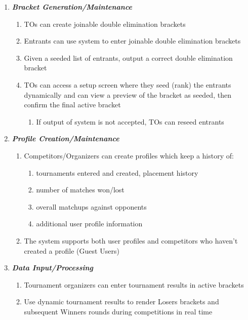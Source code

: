 \documentclass{article}
\begin{document}
\begin{enumerate}

    \item \textbf{\textit{Bracket Generation/Maintenance}}
        \begin{enumerate}[label*=\arabic*.]
            \item{{TOs can create joinable double elimination brackets}}\label{1.1}
            \item{{Entrants can use system to enter joinable double elimination brackets}}\label{1.2}
            \item{{Given a seeded list of entrants, output a correct double elimination bracket}}\label{1.3}
            \item{{TOs can access a setup screen where they seed (rank) the entrants dynamically and can view a preview of the bracket as seeded, then confirm the final active bracket}}\label{1.4}
            
                \begin{enumerate}[label*=\arabic*.]
                    \item{If output of system is not accepted, TOs can reseed entrants}
                \end{enumerate}
        \end{enumerate}

    \item \textbf{\textit{Profile Creation/Maintenance}}
        \begin{enumerate}[label*=\arabic*.]
            \item{Competitors/Organizers can create profiles which keep a history of:}\label{2.1}
            \begin{enumerate}[label*=\arabic*.]
                \item{tournaments entered and created, placement history}
                \item{number of matches won/lost}
                \item{overall matchups against opponents}
                \item{additional user profile information}
            \end{enumerate}
            \item{The system supports both user profiles and competitors who haven’t created a profile (Guest Users)}
        \end{enumerate}

    \item \textbf{\textit{Data Input/Processing}}
        \begin{enumerate}[label*=\arabic*.]
            \item{Tournament organizers can enter tournament results in active brackets}
            \item{Use dynamic tournament results to render Losers brackets and subsequent Winners rounds during competitions in real time}


\end{enumerate}
\end{enumerate}
\end{document}
